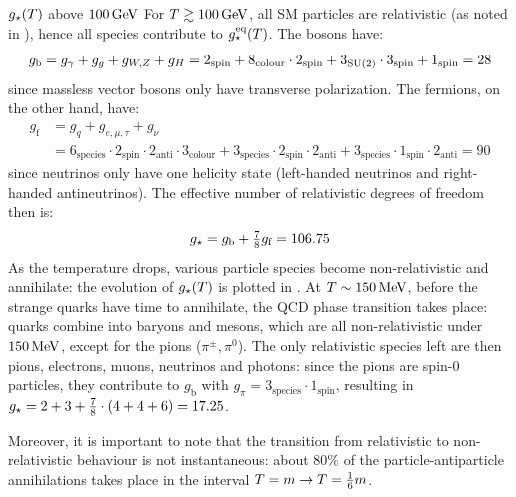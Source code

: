 \begin{example}{$ g_\star(T) $ above $ 100 \,\mathrm{GeV} $}{}
  For $ T \gtrsim 100 \,\mathrm{GeV} $, all SM particles are relativistic (as noted in ), hence all species contribute to $ g_\star^\text{eq}(T) $. The bosons have:
  \begin{equation*}
    g_\text{b} = g_\gamma + g_g + g_{W,Z} + g_H = 2_\text{spin} + 8_\text{colour} \cdot 2_\text{spin} + 3_{\mathrm{SU}(2)} \cdot 3_\text{spin} + 1_\text{spin} = 28
  \end{equation*}
  since massless vector bosons only have transverse polarization. The fermions, on the other hand, have:
  \begin{equation*}
    \begin{split}
      g_\text{f}
      & = g_q + g_{e,\mu,\tau} + g_\nu \\
      & = 6_\text{species} \cdot 2_\text{spin} \cdot 2_\text{anti} \cdot 3_\text{colour} + 3_\text{species} \cdot 2_\text{spin} \cdot 2_\text{anti} + 3_\text{species} \cdot 1_\text{spin} \cdot 2_\text{anti} = 90
    \end{split}
  \end{equation*}
  since neutrinos only have one helicity state (left-handed neutrinos and right-handed antineutrinos). The effective number of relativistic degrees of freedom then is:
  \begin{equation}
    g_\star = g_\text{b} + \tfrac{7}{8} g_\text{f} = 106.75
  \end{equation}
  As the temperature drops, various particle species become non-relativistic and annihilate: the evolution of $ g_\star(T) $ is plotted in . At $ T \sim 150 \,\mathrm{MeV} $, before the strange quarks have time to annihilate, the QCD phase transition takes place: quarks combine into baryons and mesons, which are all non-relativistic under $ 150 \,\mathrm{MeV} $, except for the pions ($ \pi^\pm , \pi^0 $). The only relativistic species left are then pions, electrons, muons, neutrinos and photons: since the pions are spin-$ 0 $ particles, they contribute to $ g_\text{b} $ with $ g_\pi = 3_\text{species} \cdot 1_\text{spin} $, resulting in $ g_\star = 2 + 3 + \frac{7}{8} \cdot (4 + 4 + 6) = 17.25 $.

  Moreover, it is important to note that the transition from relativistic to non-relativistic behaviour is not instantaneous: about $ 80\% $ of the particle-antiparticle annihilations takes place in the interval $ T = m \rightarrow T = \frac{1}{6} m $.
\end{example}

